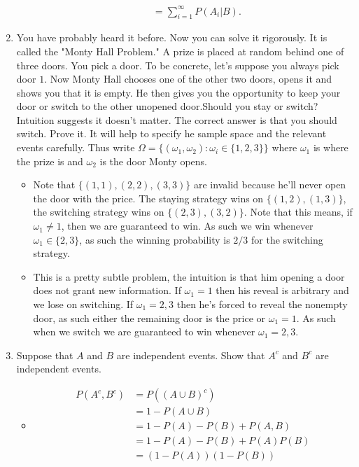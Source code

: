 \documentclass{article}
\begin{document}
\begin{enumerate}
\begin{itemize}
$$\begin{aligned}
			&= \sum_{i = 1}^\infty P(A_i|B).
			\end{aligned}
			$$
		\end{itemize}
	\item You have probably heard it before. Now you can solve it rigorously. It is called the "Monty Hall Problem." A prize is placed at random behind one of three doors. You pick a door. To be concrete, let's suppose you always pick door $1$. Now Monty Hall chooses one of the other two doors, opens it and shows you that it is empty. He then gives you the opportunity to keep your door or switch to the other unopened door.Should you stay or switch? Intuition suggests it doesn't matter. The correct answer is that you should switch. Prove it. It will help to specify he sample space and the relevant events carefully. Thus write $\Omega = \{(\omega_1, \omega_2): \omega_i \in \{1,2,3\}\}$ where $\omega_1$ is where the prize is and $\omega_2$ is the door Monty opens.
		\begin{itemize}
			\item Note that $\{(1, 1), (2, 2), (3, 3)\}$ are invalid because he'll never open the door with the price. The staying strategy wins on $\{(1, 2), (1, 3)\}$, the switching strategy wins on $\{(2, 3), (3, 2)\}$. Note that this means, if $\omega_1 \neq 1$, then we are guaranteed to win. As such we win whenever $\omega_1 \in \{2, 3\}$, as such the winning probability is $2/3$ for the switching strategy.
			\item This is a pretty subtle problem, the intuition is that him opening a door does not grant new information. If $\omega_1 = 1$ then his reveal is arbitrary and we lose on switching. If $\omega_1 = 2, 3$ then he's forced to reveal the nonempty door, as such either the remaining door is the price or $\omega_1 = 1$. As such when we switch we are guaranteed to win whenever $\omega_1 = 2, 3$.
		\end{itemize}
	\item Suppose that $A$ and $B$ are independent events. Show that $A^c$ and $B^c$ are independent events.
		\begin{itemize}
			\item
			$$
			\begin{aligned}
			P(A^c, B^c) &= P((A \cup B)^c) \\
			&= 1 - P(A \cup B) \\
			&= 1 - P(A) - P(B) + P(A, B) \\
			&= 1 - P(A) - P(B) + P(A)P(B) \\
			&= (1 - P(A))(1 - P(B)) \\

\end{aligned}$$
\end{itemize}
\end{enumerate}
\end{document}
